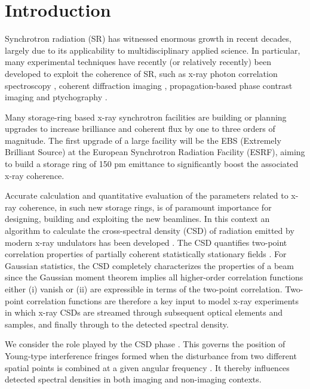 \documentclass[%
 reprint,
 amsmath,amssymb,
 aps,
]{revtex4-1}
\begin{document}
\section{Introduction}

Synchrotron radiation (SR) has witnessed enormous growth in recent decades, largely due to its applicability to multidisciplinary applied science. In particular, many experimental techniques have recently (or relatively recently) been developed to exploit the coherence of SR, such as x-ray photon correlation spectroscopy \cite{XPCS}, coherent diffraction imaging \cite{CDI}, propagation-based phase contrast imaging \cite{PBPCI} and ptychography \cite{Ptychography}. 

Many storage-ring based x-ray synchrotron facilities are building or planning upgrades to increase brilliance and coherent flux by one to three orders of magnitude.  The first upgrade of a large facility will be the EBS (Extremely Brilliant Source) \cite{orangebook} at the European Synchrotron Radiation Facility (ESRF), aiming to build a storage ring of 150 pm emittance to significantly boost the associated x-ray coherence.

Accurate calculation and quantitative evaluation of the parameters related to x-ray coherence, in such new storage rings, is of paramount importance for designing, building and exploiting the new beamlines. In this context an algorithm to calculate the cross-spectral density (CSD) of radiation emitted by modern x-ray undulators has been developed \cite{glass}.  The CSD quantifies two-point correlation properties of partially coherent statistically stationary fields \cite{Wolf1982,mandel_wolf}.  For Gaussian statistics, the CSD completely characterizes the properties of a beam since the Gaussian moment theorem implies all higher-order correlation functions either (i) vanish or (ii) are expressible in terms of the two-point correlation.  Two-point correlation functions are therefore a key input to model x-ray experiments in which x-ray CSDs are streamed through subsequent optical elements and samples, and finally through to the detected spectral density.  

We consider the role played by the CSD phase \cite{Schouten2003,GburVisser2003,Bogatyryova2003}. This governs the position of Young-type interference fringes formed when the disturbance from two different spatial points is combined at a given angular frequency \cite{mandel_wolf}.  It thereby influences detected spectral densities in both imaging and non-imaging contexts.  
\end{document}
